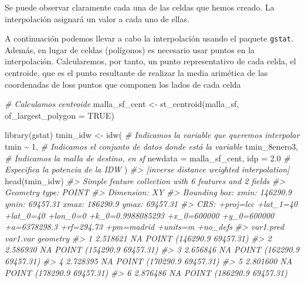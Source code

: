 \documentclass[
]{book}
\newenvironment{Shaded}{\begin{snugshade}}{\end{snugshade}}
\newcommand{\AttributeTok}[1]{\textcolor[rgb]{0.77,0.63,0.00}{#1}}
\newcommand{\CommentTok}[1]{\textcolor[rgb]{0.56,0.35,0.01}{\textit{#1}}}
\newcommand{\ConstantTok}[1]{\textcolor[rgb]{0.00,0.00,0.00}{#1}}
\newcommand{\DecValTok}[1]{\textcolor[rgb]{0.00,0.00,0.81}{#1}}
\newcommand{\FloatTok}[1]{\textcolor[rgb]{0.00,0.00,0.81}{#1}}
\newcommand{\FunctionTok}[1]{\textcolor[rgb]{0.00,0.00,0.00}{#1}}
\newcommand{\NormalTok}[1]{#1}
\newcommand{\OtherTok}[1]{\textcolor[rgb]{0.56,0.35,0.01}{#1}}
\newcommand{\SpecialCharTok}[1]{\textcolor[rgb]{0.00,0.00,0.00}{#1}}
\begin{document}
Se puede observar claramente cada una de las celdas que hemos creado. La
interpolación asignará un valor a cada uno de ellas.

A continuación podemos llevar a cabo la interpolación usando el paquete \texttt{gstat}.
Además, en lugar de celdas (polígonos) es necesario usar puntos en la
interpolación. Calcularemos, por tanto, un punto representativo de cada celda,
el centroide, que es el punto resultante de realizar la media arimética de las
coordenadas de loss puntos que componen los lados de cada celda

\begin{Shaded}
\begin{Highlighting}[]
\CommentTok{\# Calculamos centroide}
\NormalTok{malla\_sf\_cent }\OtherTok{\textless{}{-}} \FunctionTok{st\_centroid}\NormalTok{(malla\_sf, }\AttributeTok{of\_largest\_polygon =} \ConstantTok{TRUE}\NormalTok{)}

\FunctionTok{library}\NormalTok{(gstat)}
\NormalTok{tmin\_idw }\OtherTok{\textless{}{-}} \FunctionTok{idw}\NormalTok{(}
  \CommentTok{\# Indicamos la variable que queremos interpolar}
\NormalTok{  tmin }\SpecialCharTok{\textasciitilde{}} \DecValTok{1}\NormalTok{,}
  \CommentTok{\# Indicamos el conjunto de datos donde está la variable}
\NormalTok{  tmin\_8enero3,}
  \CommentTok{\# Indicamos la malla de destino, en sf}
  \AttributeTok{newdata =}\NormalTok{ malla\_sf\_cent,}
  \AttributeTok{idp =} \FloatTok{2.0} \CommentTok{\# Especifica la potencia de la IDW}
\NormalTok{)}
\CommentTok{\#\textgreater{} [inverse distance weighted interpolation]}
\FunctionTok{head}\NormalTok{(tmin\_idw)}
\CommentTok{\#\textgreater{} Simple feature collection with 6 features and 2 fields}
\CommentTok{\#\textgreater{} Geometry type: POINT}
\CommentTok{\#\textgreater{} Dimension:     XY}
\CommentTok{\#\textgreater{} Bounding box:  xmin: 146290.9 ymin: 69457.31 xmax: 186290.9 ymax: 69457.31}
\CommentTok{\#\textgreater{} CRS:           +proj=lcc +lat\_1=40 +lat\_0=40 +lon\_0=0 +k\_0=0.9988085293 +x\_0=600000 +y\_0=600000 +a=6378298.3 +rf=294.73 +pm=madrid +units=m +no\_defs}
\CommentTok{\#\textgreater{}   var1.pred var1.var                  geometry}
\CommentTok{\#\textgreater{} 1  2.518621       NA POINT (146290.9 69457.31)}
\CommentTok{\#\textgreater{} 2  2.586930       NA POINT (154290.9 69457.31)}
\CommentTok{\#\textgreater{} 3  2.656846       NA POINT (162290.9 69457.31)}
\CommentTok{\#\textgreater{} 4  2.728395       NA POINT (170290.9 69457.31)}
\CommentTok{\#\textgreater{} 5  2.801600       NA POINT (178290.9 69457.31)}
\CommentTok{\#\textgreater{} 6  2.876486       NA POINT (186290.9 69457.31)}
\end{Highlighting}
\end{Shaded}
\end{document}

